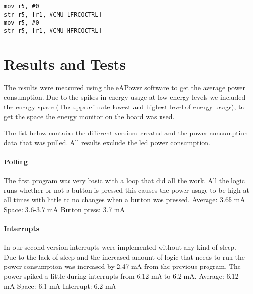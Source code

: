 \begin{lstlisting}
mov r5, #0
str r5, [r1, #CMU_LFRCOCTRL]
mov r5, #0
str r5, [r1, #CMU_HFRCOCTRL]
\end{lstlisting}

\section{Results and Tests}
\label{sec:restest}
The results were measured using the eAPower software to get the average power consumption. Due to the spikes in energy usage at low energy levels we included the energy space (The approximate lowest and highest level of energy usage), to get the space the energy monitor on the board was used.

The list below contains the different versions created and the power consumption data that was pulled. All results exclude the led power consumption.

\paragraph{Polling}
The first program\cite{polling} was very basic with a loop that did all the work. All the logic runs whether or not a button is pressed this causes the power usage to be high at all times with little to no changes when a button was pressed.\newline\newline
Average: 3.65 mA\newline
Space: 3.6-3.7 mA\newline
Button press: 3.7 mA 

\paragraph{Interrupts}
In our second version\cite{interrupt} interrupts were  implemented without any kind of sleep. Due to the lack of sleep and the increased amount of logic that needs to run the power consumption was increased by 2.47 mA from the previous program. The power spiked a little during interrupts from 6.12 mA to 6.2 mA.\newline\newline
Average: 6.12 mA\newline
Space: 6.1 mA\newline
Interrupt: 6.2 mA

